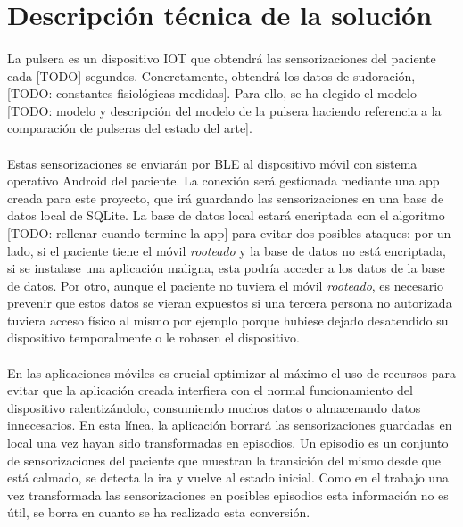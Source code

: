 \section{Descripción técnica de la solución}
\paragraph{}
La pulsera es un dispositivo IOT que obtendrá las sensorizaciones del paciente cada [TODO] segundos. Concretamente, obtendrá los datos de sudoración, [TODO: constantes fisiológicas medidas]. Para ello, se ha elegido el modelo [TODO: modelo y descripción del modelo de la pulsera haciendo referencia a la comparación de pulseras del estado del arte].

\paragraph{}
Estas sensorizaciones se enviarán por BLE al dispositivo móvil con sistema operativo Android del paciente. La conexión será gestionada mediante una app creada para este proyecto, que irá guardando las sensorizaciones en una base de datos local de SQLite. La base de datos local estará encriptada con el algoritmo [TODO: rellenar cuando termine la app] para evitar dos posibles ataques: por un lado, si el paciente tiene el móvil \textit{rooteado} y la base de datos no está encriptada, si se instalase una aplicación maligna, esta podría acceder a los datos de la base de datos. Por otro, aunque el paciente no tuviera el móvil \textit{rooteado}, es necesario prevenir que estos datos se vieran expuestos si una tercera persona no autorizada tuviera acceso físico al mismo por ejemplo porque hubiese dejado desatendido su dispositivo temporalmente o le robasen el dispositivo.

\paragraph{}
En las aplicaciones móviles es crucial optimizar al máximo el uso de recursos para evitar que la aplicación creada interfiera con el normal funcionamiento del dispositivo ralentizándolo, consumiendo muchos datos o almacenando datos innecesarios. En esta línea, la aplicación borrará las sensorizaciones guardadas en local una vez hayan sido transformadas en episodios. Un episodio es un conjunto de sensorizaciones del paciente que muestran la transición del mismo desde que está calmado, se detecta la ira y vuelve al estado inicial. Como en el trabajo una vez transformada las sensorizaciones en posibles episodios esta información no es útil, se borra en cuanto se ha realizado esta conversión.

